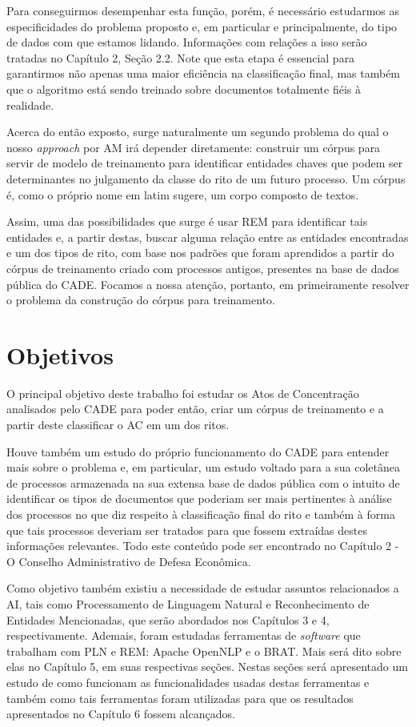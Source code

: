 \documentclass[11pt]{report}
\begin{document}
Para conseguirmos desempenhar esta função, porém, é necessário estudarmos as especificidades do problema proposto e, em particular e principalmente,
do tipo de dados com que estamos lidando. Informações com relações a isso serão tratadas no Capítulo 2, Seção 2.2.
Note que esta etapa é essencial para garantirmos não apenas uma maior eficiência na classificação final, mas também que o algoritmo está sendo treinado sobre
documentos totalmente fiéis à realidade.

Acerca do então exposto, surge naturalmente um segundo problema do qual o nosso \textit{approach} por AM irá depender diretamente: construir um córpus para servir de modelo de
treinamento para identificar entidades chaves que podem ser determinantes no julgamento da classe do rito de um futuro processo. Um córpus é, como o próprio nome em latim sugere, um corpo composto de textos.

Assim, uma das possibilidades que surge é usar REM para identificar tais entidades e, a partir destas, buscar alguma relação entre as entidades encontradas e um dos tipos de rito, com
base nos padrões que foram aprendidos a partir do córpus de treinamento criado com processos antigos, presentes na base de dados pública do CADE. Focamos
a nossa atenção, portanto, em primeiramente resolver o problema da construção do córpus para treinamento.

\section{Objetivos}

\indent\indent O principal objetivo deste trabalho foi estudar os Atos de Concentração analisados pelo CADE para poder então, criar um córpus de treinamento e a partir deste classificar
o AC em um dos ritos. 

Houve também um estudo do próprio funcionamento do CADE para entender mais sobre o problema e, em particular, um estudo voltado para a sua coletânea de processos
armazenada na sua extensa base de dados pública com o intuito de identificar os tipos de documentos que poderiam ser mais pertinentes à análise dos processos no que diz respeito
à classificação final do rito e também à forma que tais processos deveriam ser tratados para que fossem extraídas destes informações relevantes. Todo este conteúdo pode ser encontrado no
Capítulo 2 - O Conselho Administrativo de Defesa Econômica.

Como objetivo também existiu a necessidade de estudar assuntos relacionados a AI, tais como Processamento de Linguagem Natural e Reconhecimento de Entidades Mencionadas, que serão abordados nos Capítulos 3 e 4, respectivamente.
Ademais, foram estudadas ferramentas de \textit{software} que trabalham com PLN e REM: Apache OpenNLP e o BRAT. Mais será dito sobre elas no Capítulo 5, em suas
respectivas seções. Nestas seções será apresentado um estudo de como funcionam as funcionalidades usadas destas ferramentas e também como tais ferramentas foram
utilizadas para que os resultados apresentados no Capítulo 6 fossem alcançados.
\end{document}
